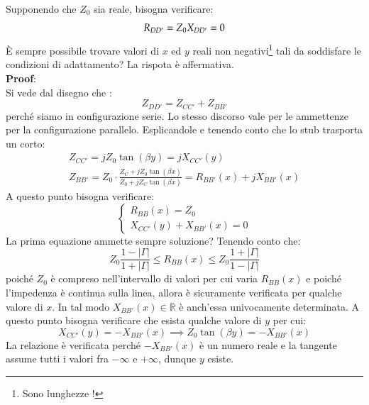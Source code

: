 \documentclass{book}
\begin{document}
        Supponendo che $Z_{0}$ sia reale, bisogna verificare:
        \begin{equation}
            R_{DD'} = Z_{0} \\
            X_{DD'} = 0
        \end{equation}
        È sempre possibile trovare valori di $x$ ed $y$ reali non negativi\footnote{Sono lunghezze !} tali da soddisfare le condizioni 
        di adattamento? La rispota è affermativa.
        \\ \textbf{Proof}: 
        \\ Si vede dal disegno che :
        \begin{equation}
            Z_{DD'} = Z_{CC'}+Z_{BB'}
        \end{equation}
        perché siamo in configurazione serie. Lo stesso discorso vale per le ammettenze per la configurazione parallelo.
        Esplicandole e tenendo conto che lo stub trasporta un corto:
        \begin{align*}
            Z_{CC'} = jZ_{0}\tan(\beta y) = jX_{CC'}(y) \\
            Z_{BB'} = Z_{0} \cdot \frac{Z_{C}+jZ_{0}\tan(\beta x)}{Z_{0}+jZ_{C}\tan(\beta x)} = R_{BB'}(x)+jX_{BB'}(x)
        \end{align*}
        A questo punto bisogna verificare:
        \begin{equation}
            \begin{cases}
                R_{BB}(x)=Z_{0} \\
                X_{CC'}(y)+X_{BB'}(x) = 0
            \end{cases}
        \end{equation}
        La prima equazione ammette sempre soluzione? Tenendo conto che:
        \begin{equation}
            Z_{0} \frac{1-|\Gamma|}{1+|\Gamma|} \leq R_{BB}(x) \leq Z_{0}\frac{1+|\Gamma|}{1-|\Gamma|}
        \end{equation}
        poiché $Z_{0}$ è compreso nell'intervallo di valori per cui varia $R_{BB}(x)$ e poiché l'impedenza è continua sulla linea,
        allora è sicuramente verificata per qualche valore di $x$. In tal modo $X_{BB'}(x) \in \mathbb{R}$ è anch'essa univocamente determinata.
        A questo punto bisogna verificare che esista qualche valore di $y$ per cui:
        \begin{equation}
            X_{CC'}(y)=-X_{BB'}(x) \implies Z_{0}\tan(\beta y) = -X_{BB'}(x)
        \end{equation} 
        La relazione è verificata perché $-X_{BB'}(x)$ è un numero reale e la tangente assume tutti i valori fra $-\infty$ e $+\infty$, dunque $y$ esiste.
\end{document}
